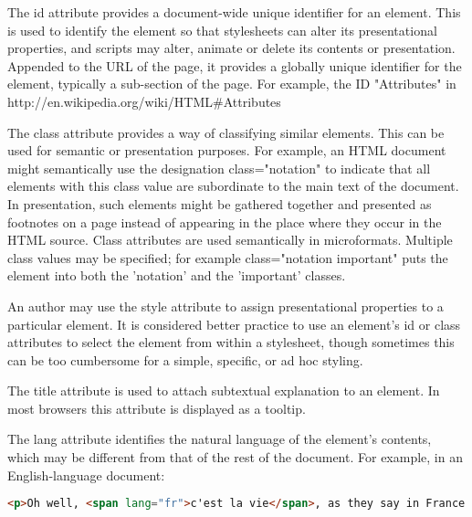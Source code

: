 \begin{compactitem}

\item The id attribute provides a document-wide unique identifier for an element. This is used to identify the element so that stylesheets can alter its presentational properties, and scripts may alter, animate or delete its contents or presentation. Appended to the URL of the page, it provides a globally unique identifier for the element, typically a sub-section of the page. For example, the ID "Attributes" in http://en.wikipedia.org/wiki/HTML\#Attributes

\item The class attribute provides a way of classifying similar elements. This can be used for semantic or presentation purposes. For example, an HTML document might semantically use the designation class="notation" to indicate that all elements with this class value are subordinate to the main text of the document. In presentation, such elements might be gathered together and presented as footnotes on a page instead of appearing in the place where they occur in the HTML source. Class attributes are used semantically in microformats. Multiple class values may be specified; for example class="notation important" puts the element into both the 'notation' and the 'important' classes.

\item An author may use the style attribute to assign presentational properties to a particular element. It is considered better practice to use an element's id or class attributes to select the element from within a stylesheet, though sometimes this can be too cumbersome for a simple, specific, or ad hoc styling.

\item The title attribute is used to attach subtextual explanation to an element. In most browsers this attribute is displayed as a tooltip.

\item The lang attribute identifies the natural language of the element's contents, which may be different from that of the rest of the document. For example, in an English-language document:

\begin{lstlisting}[language=HTML]
<p>Oh well, <span lang="fr">c'est la vie</span>, as they say in France.</p>
\end{lstlisting}

\end{compactitem}

